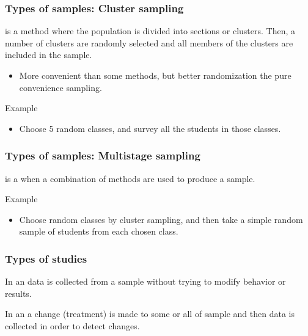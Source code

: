 \documentclass[xcolor=table, aspectratio=169, bigger, handout]{beamer}
\begin{document}
\begin{frame}
\frametitle{Types of samples: Cluster sampling}

\begin{block}{}
 is a method where the population is divided into sections or clusters. Then, a number of clusters are randomly selected and all members of the clusters are included in the sample.
\begin{itemize}
\item More convenient than some methods, but better randomization the pure convenience sampling.
\end{itemize}
\end{block}
\pause
\begin{exampleblock}{Example}
\begin{itemize}
\item Choose 5 random classes, and survey all the students in those classes.
\end{itemize}
\end{exampleblock}
\end{frame}

\begin{frame}
\frametitle{Types of samples: Multistage sampling}

\begin{block}{}
 is a when a combination of methods are used to produce a sample.
\end{block}
\pause
\begin{exampleblock}{Example}
\begin{itemize}
\item Choose random classes by cluster sampling, and then take a simple random sample of students from each chosen class.  
\end{itemize}
\end{exampleblock}
\end{frame}

\begin{frame}
\frametitle{Types of studies}

\begin{block}{}
In an  data is collected from a sample without trying to modify behavior or results. 
\end{block}
\pause
\begin{block}{}
In an  a change (treatment) is made to some or all of sample and then data is collected in order to detect changes. 
\end{block}

\end{frame}
\end{document}
